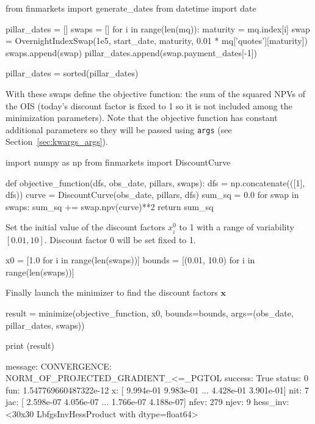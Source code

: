 \begin{ipython}
from finmarkets import generate_dates
from datetime import date

pillar_dates = []
swaps = []
for i in range(len(mq)):
    maturity = mq.index[i]
    swap = OvernightIndexSwap(1e5, start_date,
                              maturity,
                              0.01 * mq['quotes'][maturity])
    swaps.append(swap)
    pillar_dates.append(swap.payment_dates[-1])

pillar_dates = sorted(pillar_dates)
\end{ipython}
With these swaps define the objective function: the sum of the squared NPVs of the OIS (today's discount factor is fixed to 1 so it is not included among the minimization parameters). Note that the objective function has constant additional parameters so they will be passed using \texttt{args} (see Section~\ref{sec:kwargs_args}). 

\begin{ipython}
import numpy as np
from finmarkets import DiscountCurve 

def objective_function(dfs, obs_date, pillars, swaps):
    dfs = np.concatenate(([1], dfs))
    curve = DiscountCurve(obs_date, pillars, dfs)
    sum_sq = 0.0
    for swap in swaps:
        sum_sq += swap.npv(curve)**2
    return sum_sq
\end{ipython}
Set the initial value of the discount factors $x_i^0$ to 1 with a range of variability $[0.01, 10]$. Discount factor 0 will be set fixed to 1.

\begin{ipython}
x0 = [1.0 for i in range(len(swaps))]
bounds = [(0.01, 10.0) for i in range(len(swaps))]
\end{ipython}
Finally launch the minimizer to find the discount factors $\mathbf{x}$

\begin{ipython}
result = minimize(objective_function, x0, bounds=bounds,
                  args=(obs_date, pillar_dates, swaps))

print (result)
\end{ipython}
\begin{ioutput}
  message: CONVERGENCE: NORM_OF_PROJECTED_GRADIENT_<=_PGTOL
  success: True
   status: 0
      fun: 1.547769660487322e-12
        x: [ 9.994e-01  9.983e-01 ...  4.428e-01  3.901e-01]
      nit: 7
      jac: [ 2.598e-07  4.056e-07 ...  1.766e-07  4.188e-07]
     nfev: 279
     njev: 9
 hess_inv: <30x30 LbfgsInvHessProduct with dtype=float64>\end{ioutput}

